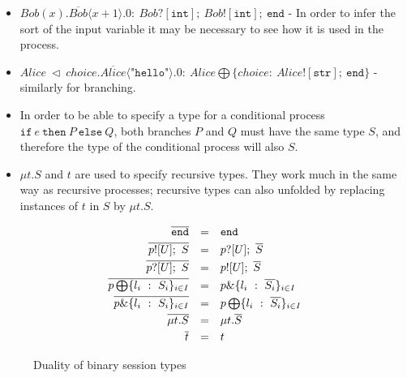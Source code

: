 \documentclass[12pt,twoside]{report}
\begin{document}
\begin{itemize}
    \item $Bob(x).\overline{Bob} \langle x + 1 \rangle.0:\ Bob?[\texttt{int}];\ Bob![\texttt{int}];\ \texttt{end}$ - In order to infer the sort of the input variable it may be necessary to see how it is used in the process.
    \item $Alice\ \triangleleft\ choice.\overline{Alice} \langle \texttt{"hello"} \rangle.0:\ Alice \bigoplus \{choice:\ Alice![\texttt{str}];\ \texttt{end}\}$ - similarly for branching.
    \item In order to be able to specify a type for a conditional process $\texttt{if}\ e\ \texttt{then}\ P\ \texttt{else}\ Q$, both branches $P$ and $Q$ must have the same type $S$, and therefore the type of the conditional process will also $S$.
    \item $\mu t.S$ and $t$ are used to specify recursive types. They work much in the same way as recursive processes; recursive types can also unfolded by replacing instances of $t$ in $S$ by $\mu t.S$.
\end{itemize} 

\begin{figure}[h!]
    \centering
    \begin{equation*}
    \centering
    \begin{array}{rcl}
             \overline{\texttt{end}} & = & \texttt{end}  \\[2.75pt]
             \overline{p![U];\ S} & = & p?[U];\ \overline{S} \\[2.75pt]
             \overline{p?[U];\ S} & = & p![U];\ \overline{S} \\[2.75pt]
             \overline{p \bigoplus \{l_i\ :\ S_i\}_{i \in I}} & = & p \& \{l_i\ :\ \overline{S_i}\}_{i \in I}\\[2.75pt]
             \overline{p \& \{l_i\ :\ S_i\}_{i \in I}} & = & p \bigoplus \{l_i\ :\ \overline{S_i}\}_{i \in I}\\[2.75pt]
             \overline{\mu t.S} & = & \mu t.\overline{S}\\[2.75pt]
             \overline{t} & = & t
        \end{array}
    \end{equation*}
    \caption{Duality of binary session types}
    \label{bst_duality}
\end{figure}{}
\end{document}
